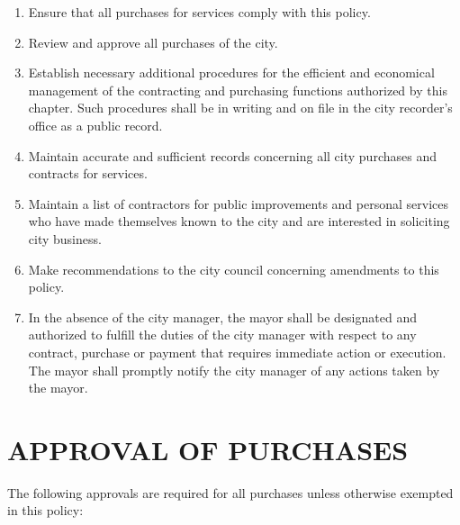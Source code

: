 \begin{enumerate}
	\item Ensure that all purchases for services comply with this policy. 
	\item Review and approve all purchases of the city. 
	\item Establish necessary additional procedures for the efficient and economical management of the contracting and purchasing functions authorized by this chapter. Such procedures shall be in writing and on file in the city recorder’s office as a public record. 
	\item Maintain accurate and sufficient records concerning all city purchases and contracts for services. 
	\item Maintain a list of contractors for public improvements and personal services who have made themselves known to the city and are interested in soliciting city business. 
	\item Make recommendations to the city council concerning amendments to this policy. 
	\item In the absence of the city manager, the mayor shall be designated and authorized to fulfill the duties of the city manager with respect to any contract, purchase or payment that requires immediate action or execution. The mayor shall promptly notify the city manager of any actions taken by the mayor. 
\end{enumerate}

\section{APPROVAL OF PURCHASES}
The following approvals are required for all purchases unless otherwise exempted in this policy:


